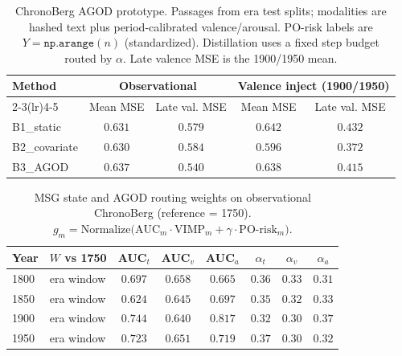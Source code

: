 
\begin{table}[ht]
\centering
\caption{ChronoBerg AGOD prototype. Passages from era test splits; modalities are hashed text plus period-calibrated valence/arousal. PO-risk labels are $Y=\texttt{np.arange}(n)$ (standardized). Distillation uses a fixed step budget routed by $\alpha$. Late valence MSE is the 1900/1950 mean.}
\label{tab:chronoberg-agod-summary}
\small
\begin{tabular}{@{}l cc cc@{}}
\toprule
Method & \multicolumn{2}{c}{Observational} & \multicolumn{2}{c}{Valence inject (1900/1950)} \\
\cmidrule(lr){2-3}\cmidrule(lr){4-5}
 & Mean MSE & Late val. MSE & Mean MSE & Late val. MSE \\
\midrule
B1\_static & $0.631$ & $0.579$ & $0.642$ & $0.432$ \\
B2\_covariate & $0.630$ & $0.584$ & $0.596$ & $0.372$ \\
B3\_AGOD & $0.637$ & $0.540$ & $0.638$ & $0.415$ \\
\bottomrule
\end{tabular}
\end{table}

\begin{table}[ht]
\centering
\caption{MSG state and AGOD routing weights on observational ChronoBerg (reference = 1750). $g_m=\mathrm{Normalize}(\mathrm{AUC}_m\cdot\mathrm{VIMP}_m+\gamma\cdot\mathrm{PO}$-$\mathrm{risk}_m)$.}
\label{tab:chronoberg-agod-msg}
\small
\begin{tabular}{@{}l l ccc ccc@{}}
\toprule
Year & $W$ vs 1750 & AUC$_t$ & AUC$_v$ & AUC$_a$ & $\alpha_t$ & $\alpha_v$ & $\alpha_a$ \\
\midrule
1800 & era window & $0.697$ & $0.658$ & $0.665$ & $0.36$ & $0.33$ & $0.31$ \\
1850 & era window & $0.624$ & $0.645$ & $0.697$ & $0.35$ & $0.32$ & $0.33$ \\
1900 & era window & $0.744$ & $0.640$ & $0.817$ & $0.32$ & $0.30$ & $0.37$ \\
1950 & era window & $0.723$ & $0.651$ & $0.719$ & $0.37$ & $0.30$ & $0.32$ \\
\bottomrule
\end{tabular}
\end{table}
